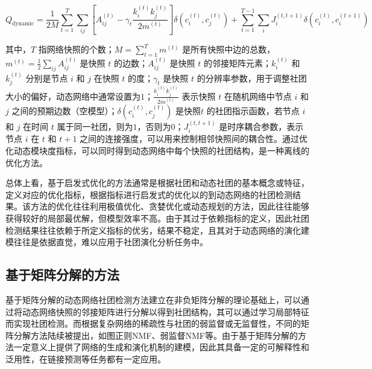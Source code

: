 \begin{equation}
	Q_{\text{dynamic}} = \frac{1}{2M} \sum_{t=1}^{T} \sum_{ij} \left[ A_{ij}^{(t)} - \gamma_t \frac{k_i^{(t)} k_j^{(t)}}{2m^{(t)}} \right] \delta(c_i^{(t)}, c_j^{(t)}) + \sum_{t=1}^{T-1} \sum_{i} J_{i}^{(t, t+1)} \delta(c_i^{(t)}, c_i^{(t+1)})
\end{equation}



其中，\( T \) 指网络快照的个数；\( M = \sum_{t=1}^{T} m^{(t)} \) 是所有快照中边的总数，\( m^{(t)} = \frac{1}{2} \sum_{ij} A_{ij}^{(t)} \) 是快照 \( t \) 的边数；\( A_{ij}^{(t)} \) 是快照 \( t \) 的邻接矩阵元素；\( k_i^{(t)} \) 和 \( k_j^{(t)} \) 分别是节点 \( i \) 和 \( j \) 在快照 \( t \) 的度；\( \gamma_t \) 是快照 \( t \) 的分辨率参数，用于调整社团大小的偏好，动态网络中通常设置为$1$；\( \frac{k_i^{(t)} k_j^{(t)}}{2m^{(t)}} \) 表示快照 \( t \) 在随机网络中节点 \( i \) 和 \( j \) 之间的预期边数（空模型）；\( \delta(c_i^{(t)}, c_j^{(t)}) \) 是快照\( t \) 的社团指示函数，若节点 \( i \) 和 \( j \) 在时间 \( t \) 属于同一社团，则为$1$，否则为$0$；\( J_{i}^{(t, t+1)} \) 是时序耦合参数，表示节点 \( i \) 在 \( t \) 和 \( t+1 \) 之间的连接强度，可以用来控制相邻快照间的耦合性。通过优化动态模块度指标，可以同时得到动态网络中每个快照的社团结构，是一种离线的优化方法\cite{sarzynska2016null,10452807}。

总体上看，基于启发式优化的方法通常是根据社团和动态社团的基本概念或特征，定义对应的优化指标，根据指标进行启发式的优化以的到动态网络的社团检测结果。该方法的优化往往利用极值优化、贪婪优化或动态规划的方法，因此往往能够获得较好的局部最优解，但模型效率不高。由于其过于依赖指标的定义，因此社团检测结果往往依赖于所定义指标的优劣，结果不稳定，且其对于动态网络的演化建模往往是依据直觉，难以应用于社团演化分析任务中。



\subsection{基于矩阵分解的方法}
基于矩阵分解的动态网络社团检测方法建立在非负矩阵分解的理论基础上，可以通过将动态网络快照的邻接矩阵进行分解以得到社团结构，其可以通过学习局部特征而实现社团检测\cite{lee1999learning}。而根据复杂网络的稀疏性与社团的弱监督或无监督性，不同的矩阵分解方法陆续被提出，如图正则NMF\cite{cai2010graph}、弱监督NMF\cite{choo2015weakly}等。由于基于矩阵分解的方法一定意义上提供了网络的生成和演化机制的建模，因此其具备一定的可解释性和泛用性，在链接预测\cite{ma2017nonnegative}等任务都有一定应用。

